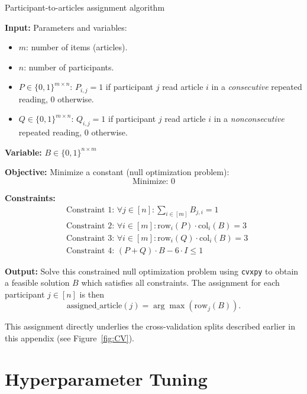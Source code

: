 \begin{algorithm*}[ht!]
\caption{Participant-to-articles assignment algorithm}
\label{app:CV_alg}
\begin{algorithmic}
    \State \textbf{Input:} Parameters and variables:
    \begin{itemize}
        \item \(m\): number of items (articles).
        \item \(n\): number of participants.
        \item \(P \in \{0, 1\}^{m\times n}\): \(P_{i,j} = 1\) if participant \(j\) read article \(i\) in a \emph{consecutive} repeated reading, 0 otherwise.
        \item \(Q \in \{0, 1\}^{m\times n}\): \(Q_{i,j} = 1\) if participant \(j\) read article \(i\) in a \emph{nonconsecutive} repeated reading, 0 otherwise.
    \end{itemize}
    \State \textbf{Variable:} \( B \in \{0, 1\}^{n\times m} \)

    \State \textbf{Objective:} Minimize a constant (null optimization problem):
    \[
        \text{Minimize: } 0
    \]
    
    \State \textbf{Constraints:} 
    \begin{align*}
        & \text{Constraint 1: } \forall j \in [n]: \sum_{i\in [m]}{B_{j,i}} = 1 \\
        & \text{Constraint 2: } \forall i \in [m]: \text{row}_i(P) \cdot \text{col}_i(B) = 3 \\
        & \text{Constraint 3: } \forall i \in [m]: \text{row}_i(Q) \cdot \text{col}_i(B) = 3 \\
        & \text{Constraint 4: } (P+Q) \cdot B - 6\cdot I \leq 1
    \end{align*}
    
    \State \textbf{Output: } 
    Solve this constrained null optimization problem using \texttt{cvxpy} to obtain a feasible solution \(B\) which satisfies all constraints. The assignment for each participant \(j \in [n]\) is then
    \[
        \text{assigned\_article}(j) = \arg\max(\text{row}_j(B)).
    \]
\end{algorithmic}
\end{algorithm*}

This assignment directly underlies the cross-validation splits described earlier in this appendix (see Figure~\ref{fig:CV}).


\section{Hyperparameter Tuning}
\label{app:hyperparams}

